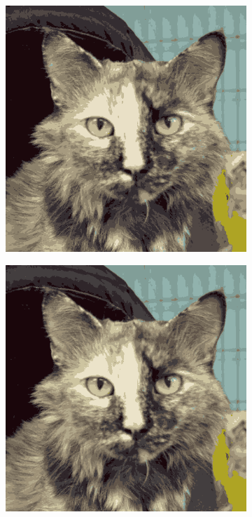 \begin{figure}[htb]
\begin{subfigure}{.3\textwidth}
        \includegraphics[width=\linewidth]{../../python_code/plots/kmeans/cat-10/reconstruction-11.png}
    \end{subfigure}
    \begin{subfigure}{.3\textwidth}
        \includegraphics[width=\linewidth]{../../python_code/plots/kmeans/cat-10/reconstruction-13.png}

\end{subfigure}
\end{figure}
